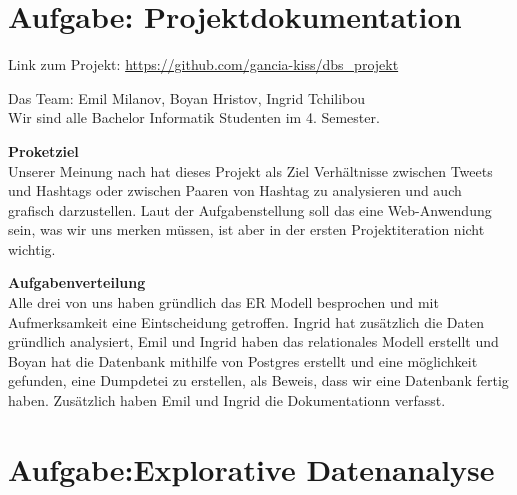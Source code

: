\usepackage{graphicx}

\newcommand{\dozent}{Prof.  Dr.  Agnès Voisard, Nicolas Lehmann}					%
\newcommand{\tutor}{Hoffman Christian}						%
\newcommand{\tutoriumNo}{Tutorium 3}				%
\newcommand{\projectNo}{1}									%
\newcommand{\veranstaltung}{Datenbank Systeme}	%
\newcommand{\semester}{SoeSe 2017}						%
\newcommand{\studenten}{IngridTchilibou,Emil,Boyan Hristov}			%





\section{Aufgabe: Projektdokumentation}
Link zum Projekt: \url{https://github.com/gancia-kiss/dbs_projekt}

Das Team: Emil Milanov, Boyan Hristov, Ingrid Tchilibou\\
Wir sind alle Bachelor Informatik Studenten im 4. Semester.

\textbf{Proketziel}\\
Unserer Meinung nach hat dieses Projekt als Ziel Verhältnisse zwischen Tweets und Hashtags oder zwischen Paaren von Hashtag zu 
analysieren und auch grafisch darzustellen. Laut der Aufgabenstellung soll das eine Web-Anwendung sein, was wir uns merken 
müssen, ist aber in der ersten Projektiteration nicht wichtig. 


\textbf{Aufgabenverteilung}\\
Alle drei von uns haben gründlich das ER Modell besprochen und mit Aufmerksamkeit eine Eintscheidung getroffen. Ingrid hat zusätzlich die Daten gründlich analysiert, Emil und Ingrid haben das relationales Modell erstellt und Boyan hat die Datenbank mithilfe von Postgres erstellt und eine möglichkeit gefunden, eine Dumpdetei zu erstellen, als Beweis, dass wir eine Datenbank fertig haben. Zusätzlich haben Emil und Ingrid die Dokumentationn verfasst.



\section{Aufgabe:Explorative Datenanalyse}


